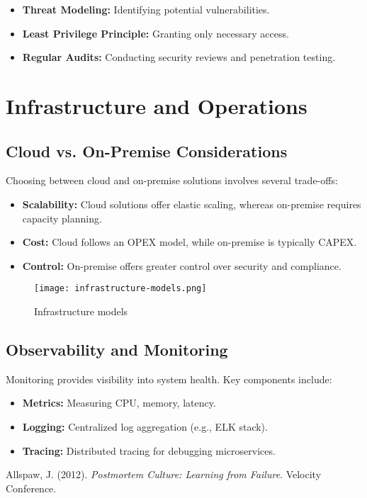 \begin{itemize}
    \item \textbf{Threat Modeling:} Identifying potential vulnerabilities.
    \item \textbf{Least Privilege Principle:} Granting only necessary access.
    \item \textbf{Regular Audits:} Conducting security reviews and penetration testing.
\end{itemize}

\section{Infrastructure and Operations}

\subsection{Cloud vs. On-Premise Considerations}

Choosing between cloud and on-premise solutions involves several trade-offs:

\begin{itemize}
    \item \textbf{Scalability:} Cloud solutions offer elastic scaling, whereas on-premise requires capacity planning.
    \item \textbf{Cost:} Cloud follows an OPEX model, while on-premise is typically CAPEX.
    \item \textbf{Control:} On-premise offers greater control over security and compliance.
\end{itemize}

\begin{figure}[h]
    \centering
    \texttt{[image: infrastructure-models.png]}
    \caption{Infrastructure models}
\end{figure}

\subsection{Observability and Monitoring}

Monitoring provides visibility into system health. Key components include:

\begin{itemize}
    \item \textbf{Metrics:} Measuring CPU, memory, latency.
    \item \textbf{Logging:} Centralized log aggregation (e.g., ELK stack).
    \item \textbf{Tracing:} Distributed tracing for debugging microservices.
\end{itemize}





\begin{thebibliography}{9}
     Allspaw, J. (2012). \textit{Postmortem Culture: Learning from Failure}. Velocity Conference.
\end{thebibliography}


